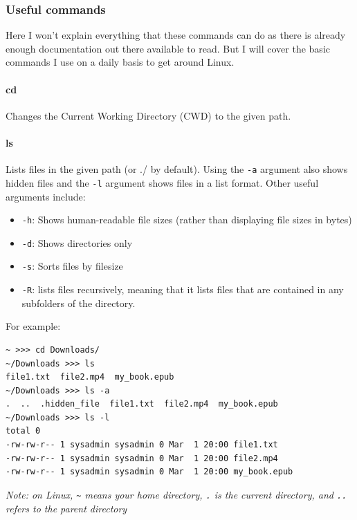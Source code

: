 \hypertarget{useful-commands}{%
\subsubsection{Useful commands}\label{useful-commands}}

Here I won't explain everything that these commands can do as there is already enough documentation out there available to read. But I will cover the basic commands I use on a daily basis to get around Linux.

\hypertarget{cd}{%
\paragraph{cd}\label{cd}}

Changes the Current Working Directory (CWD) to the given path.

\hypertarget{ls}{%
\paragraph{ls}\label{ls}}

Lists files in the given path (or ./ by default). Using the \texttt{-a} argument also shows hidden files and the \texttt{-l} argument shows files in a list format. Other useful arguments include:

\begin{itemize}
\tightlist
\item
  \texttt{-h}: Shows human-readable file sizes (rather than displaying file sizes in bytes)
\item
  \texttt{-d}: Shows directories only
\item
  \texttt{-s}: Sorts files by filesize
\item
  \texttt{-R}: lists files recursively, meaning that it lists files that are contained in any subfolders of the directory.
\end{itemize}

For example:

\begin{verbatim}
~ >>> cd Downloads/
~/Downloads >>> ls
file1.txt  file2.mp4  my_book.epub
~/Downloads >>> ls -a
.  ..  .hidden_file  file1.txt  file2.mp4  my_book.epub
~/Downloads >>> ls -l
total 0
-rw-rw-r-- 1 sysadmin sysadmin 0 Mar  1 20:00 file1.txt
-rw-rw-r-- 1 sysadmin sysadmin 0 Mar  1 20:00 file2.mp4
-rw-rw-r-- 1 sysadmin sysadmin 0 Mar  1 20:00 my_book.epub
\end{verbatim}

\emph{Note: on Linux, \texttt{\textasciitilde{}} means your home directory, \texttt{.} is the current directory, and \texttt{..} refers to the parent directory}

